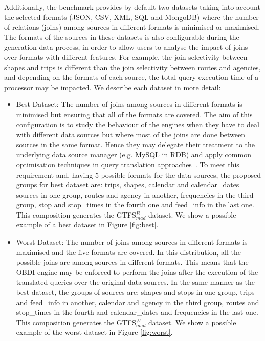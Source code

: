 \begin{enumerate}[label=\textbf{\arabic*})]
    Additionally, the benchmark provides by default two datasets taking into account the selected formats (JSON, CSV, XML, SQL and MongoDB) where the number of relations (joins) among sources in different formats is minimised or maximised. The formats of the sources in these datasets is also configurable during the generation data process, in order to allow users to analyse the impact of joins over formats with different features. For example, the join selectivity between shapes and trips is different than the join selectivity between routes and agencies, and depending on the formats of each source, the total query execution time of a processor may be impacted. We describe each dataset in more detail:
    \begin{itemize}
        \item Best Dataset: The number of joins among sources in different formats is minimised but ensuring that %
        all of the formats are covered. The aim of this configuration is to study the behaviour of the engines when they have to deal with different data sources but where most of the joins are done between sources in the same format. Hence they may delegate their treatment to the underlying data source manager (e.g. MySQL in RDB) and apply common optimisation techniques in query translation approaches~\citep{priyatna2014formalisation}. To meet this requirement and, having 5 possible formats for the data sources, the proposed groups for best dataset are: trips, shapes, calendar and calendar\_dates sources in one group, routes and agency in another, frequencies in the third group, stop and stop\_times in the fourth one and feed\_info in the last one. This composition generates the GTFS$_{mad}^{B}$ dataset. We show a possible example of a best dataset in Figure \ref{fig:best}. 
       
        \item Worst Dataset: The number of joins among sour\-ces in different formats is maximised and the five formats are covered. In this distribution, all the possible joins are among
        sources in different formats. This means that the OBDI engine may be enforced to perform the joins after the execution of the translated queries over the original data sources. In the same manner as the best dataset, the groups of sources are: shapes and stops in one group, trips and feed\_info in another, calendar and agency in the third group, routes and stop\_times in the fourth and calendar\_dates and frequencies in the last one. This composition generates the GTFS$_{mad}^{W}$ dataset. We show a possible example of the worst dataset in Figure \ref{fig:worst}. 
    \end{itemize}
   
\end{enumerate}
 

